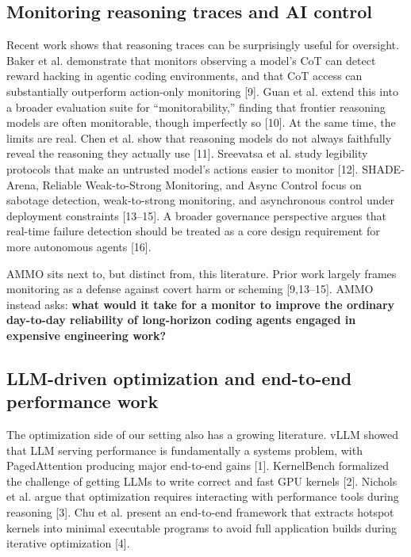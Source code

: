 \documentclass[11pt]{article}
\begin{document}
\subsection{Monitoring reasoning traces and AI control}

Recent work shows that reasoning traces can be surprisingly useful for oversight. Baker et al. demonstrate that monitors observing a model's CoT can detect reward hacking in agentic coding environments, and that CoT access can substantially outperform action-only monitoring [9]. Guan et al. extend this into a broader evaluation suite for ``monitorability,'' finding that frontier reasoning models are often monitorable, though imperfectly so [10]. At the same time, the limits are real. Chen et al. show that reasoning models do not always faithfully reveal the reasoning they actually use [11]. Sreevatsa et al. study legibility protocols that make an untrusted model's actions easier to monitor [12]. SHADE-Arena, Reliable Weak-to-Strong Monitoring, and Async Control focus on sabotage detection, weak-to-strong monitoring, and asynchronous control under deployment constraints [13--15]. A broader governance perspective argues that real-time failure detection should be treated as a core design requirement for more autonomous agents [16].

AMMO sits next to, but distinct from, this literature. Prior work largely frames monitoring as a defense against covert harm or scheming [9,13--15]. AMMO instead asks: \textbf{what would it take for a monitor to improve the ordinary day-to-day reliability of long-horizon coding agents engaged in expensive engineering work?}

\subsection{LLM-driven optimization and end-to-end performance work}

The optimization side of our setting also has a growing literature. vLLM showed that LLM serving performance is fundamentally a systems problem, with PagedAttention producing major end-to-end gains [1]. KernelBench formalized the challenge of getting LLMs to write correct and fast GPU kernels [2]. Nichols et al. argue that optimization requires interacting with performance tools during reasoning [3]. Chu et al. present an end-to-end framework that extracts hotspot kernels into minimal executable programs to avoid full application builds during iterative optimization [4].
\end{document}
